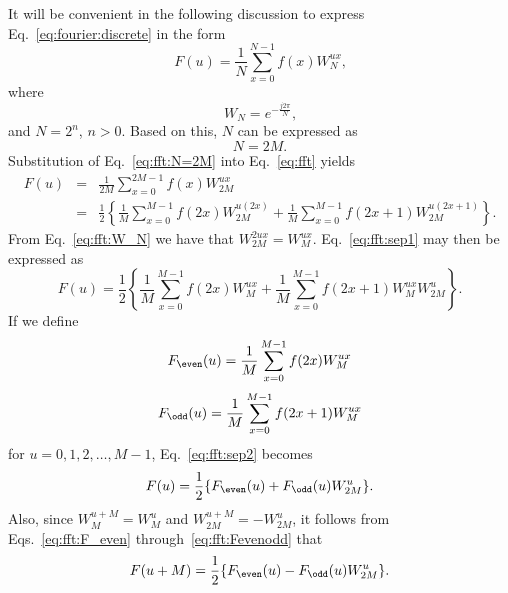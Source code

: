 It will be convenient in the following discussion to express
Eq.~\ref{eq:fourier:discrete} in the form
\begin{equation}
\label{eq:fft}
  F(u)=\frac{1}{N}\sum_{x=0}^{N-1}f(x)W_{N}^{ux}\mbox{,}
\end{equation}
where
\begin{equation}
\label{eq:fft:W_N}
  W_{N}=e^{-\frac{j2\pi}{N}}\mbox{,}
\end{equation}
and $N=2^{n}$, $n>0$.  Based on this, $N$ can be expressed as
\begin{equation}
\label{eq:fft:N=2M}
  N=2M\mbox{.}
\end{equation}
Substitution of Eq.~\ref{eq:fft:N=2M} into Eq.~\ref{eq:fft}
yields 
\begin{eqnarray}
\label{eq:fft:sep1}
  F(u) & = & \frac{1}{2M}\sum_{x=0}^{2M-1}f(x)W_{2M}^{ux}\nonumber\\
       & = & \frac{1}{2}\left\{\frac{1}{M}\sum_{x=0}^{M-1}
             f(2x)W_{2M}^{u(2x)}+
             \frac{1}{M}\sum_{x=0}^{M-1}
             f(2x+1)W_{2M}^{u(2x+1)}\right\}\mbox{.}
\end{eqnarray}
From Eq.~\ref{eq:fft:W_N} we have that $W_{2M}^{2ux}=W_{M}^{ux}$.
Eq.~\ref{eq:fft:sep1} may then be expressed as
\begin{equation}
\label{eq:fft:sep2}
  F(u)=\frac{1}{2}\left\{\frac{1}{M}\sum_{x=0}^{M-1}f(2x)W_{M}^{ux}+
  \frac{1}{M}\sum_{x=0}^{M-1}f(2x+1)W_{M}^{ux}W_{2M}^{u}\right\}\mbox{.}
\end{equation}
If we define
\begin{equation}
\label{eq:fft:F_even}
  F_{\even}(u)=\frac{1}{M}\sum_{x=0}^{M-1}f(2x)W_{M}^{ux}
\end{equation}
\begin{equation}
\label{eq:fft:F_odd}
  F_{\odd}(u)=\frac{1}{M}\sum_{x=0}^{M-1}f(2x+1)W_{M}^{ux}
\end{equation}
for $u=0,1,2,\ldots,M-1$, Eq.~\ref{eq:fft:sep2} becomes
\begin{equation}
\label{eq:fft:Fevenodd}
  F(u)=\frac{1}{2}\{F_{\even}(u)+F_{\odd}(u)W_{2M}^{u}\}\mbox{.}
\end{equation}
Also, since $W_{M}^{u+M}=W_{M}^{u}$ and $W_{2M}^{u+M}=-W_{2M}^{u}$, it
follows from Eqs.~\ref{eq:fft:F_even} through~\ref{eq:fft:Fevenodd}
that
\begin{equation}
\label{eq:fft:doubling}
  F(u+M)=\frac{1}{2}\{F_{\even}(u)-F_{\odd}(u)W_{2M}^{u}\}\mbox{.}
\end{equation}

